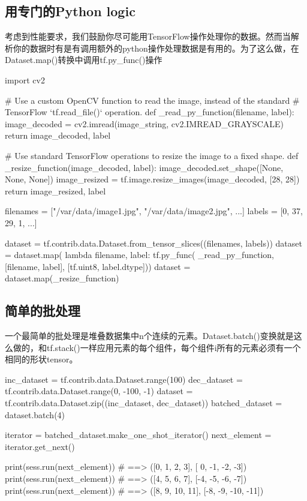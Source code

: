 \subsection{用专门的Python logic}
考虑到性能要求，我们鼓励你尽可能用TensorFlow操作处理你的数据。然而当解析你的数据时有是有调用额外的python操作处理数据是有用的。为了这么做，在Dataset.map()转换中调用tf.py\_func()操作
\begin{python}
import cv2

# Use a custom OpenCV function to read the image, instead of the standard
# TensorFlow `tf.read\_file()` operation.
def _read_py_function(filename, label):
  image_decoded = cv2.imread(image_string, cv2.IMREAD_GRAYSCALE)
  return image_decoded, label

# Use standard TensorFlow operations to resize the image to a fixed shape.
def _resize_function(image_decoded, label):
  image_decoded.set_shape([None, None, None])
  image_resized = tf.image.resize_images(image_decoded, [28, 28])
  return image_resized, label

filenames = ["/var/data/image1.jpg", "/var/data/image2.jpg", ...]
labels = [0, 37, 29, 1, ...]

dataset = tf.contrib.data.Dataset.from_tensor_slices((filenames, labels))
dataset = dataset.map(
    lambda filename, label: tf.py_func(
        _read_py_function, [filename, label], [tf.uint8, label.dtype]))
dataset = dataset.map(_resize_function)
\end{python}
\subsection{简单的批处理}
一个最简单的批处理是堆叠数据集中n个连续的元素。Dataset.batch()变换就是这么做的，和tf.stack()一样应用元素的每个组件，每个组件i所有的元素必须有一个相同的形状tensor。
\begin{python}
inc_dataset = tf.contrib.data.Dataset.range(100)
dec_dataset = tf.contrib.data.Dataset.range(0, -100, -1)
dataset = tf.contrib.data.Dataset.zip((inc_dataset, dec_dataset))
batched_dataset = dataset.batch(4)

iterator = batched_dataset.make_one_shot_iterator()
next_element = iterator.get_next()

print(sess.run(next_element))  # ==> ([0, 1, 2,   3],   [ 0, -1,  -2,  -3])
print(sess.run(next_element))  # ==> ([4, 5, 6,   7],   [-4, -5,  -6,  -7])
print(sess.run(next_element))  # ==> ([8, 9, 10, 11],   [-8, -9, -10, -11])
\end{python}
